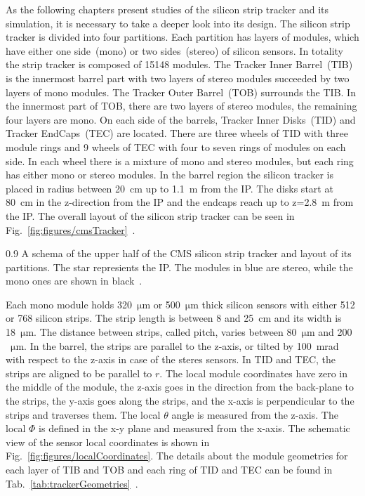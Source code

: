 As the following chapters present studies of the silicon strip tracker and its simulation, it is necessary to take a deeper look into its design. The silicon strip tracker is divided into four partitions. Each partition has layers of modules, which have either one side~(mono) or two sides~(stereo) of silicon sensors. In totality the strip tracker is composed of 15148 modules. The Tracker Inner Barrel~(TIB) is the innermost barrel part with two layers of stereo modules succeeded by two layers of mono modules. The Tracker Outer Barrel~(TOB) surrounds the TIB. In the innermost part of TOB, there are two layers of stereo modules, the remaining four layers are mono. On each side of the barrels, Tracker Inner Disks~(TID) and Tracker EndCaps~(TEC) are located. There are three wheels of TID with three module rings and 9 wheels of TEC with four to seven rings of modules on each side. In each wheel there is a mixture of mono and stereo modules, but each ring has either mono or stereo modules. In the barrel region the silicon tracker is placed in radius between 20~cm up to 1.1~m from the IP. The disks start at 80~cm in the z-direction from the IP and the endcaps reach up to z=2.8~m from the IP. The overall layout of the silicon strip tracker can be seen in Fig.~\ref{fig:figures/cmsTracker}~\cite{Chatrchyan:2014fea}.

                 {0.9}       
                 {A schema of the upper half of the CMS silicon strip tracker and layout of its partitions. The star represients the IP. The modules in blue are stereo, while the mono ones are shown in black~\cite{Chatrchyan:2014fea}. }

Each mono module holds 320~$\mathrm{\mu m}$ or 500~$\mathrm{\mu m}$ thick silicon sensors with either 512 or 768 silicon strips.  The strip length is between 8 and 25~cm and its width is 18~$\mathrm{\mu m}$. The distance between strips, called pitch, varies between 80~$\mathrm{\mu m}$ and 200 ~$\mathrm{\mu m}$. In the barrel, the strips are parallel to the z-axis, or tilted by 100~mrad with respect to the z-axis in case of the steres sensors. In TID and TEC, the strips are aligned to be parallel to $r$. The local module coordinates have zero in the middle of the module, the z-axis goes in the direction from the back-plane to the strips, the y-axis goes along the strips, and the x-axis is perpendicular to the strips and traverses them. The local $\theta$ angle is measured from the z-axis. The local $\Phi$ is defined in the x-y plane and measured from the x-axis. The schematic view of the sensor local coordinates is shown in Fig.~\ref{fig:figures/localCoordinates}. The details about the module geometries for each layer of TIB and TOB and each ring of TID and TEC can be found in Tab.~\ref{tab:trackerGeometries}~\cite{website:hephyPage}.


